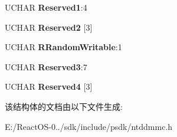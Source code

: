 \begin{DoxyCompactItemize}
U\+C\+H\+AR {\bfseries Reserved1}\+:4
\item 
\mbox{\label{struct___f_e_a_t_u_r_e___d_a_t_a___f_o_r_m_a_t_t_a_b_l_e_a8f4deebce1a43aa37687ca889d1733a8}} 
U\+C\+H\+AR {\bfseries Reserved2} \mbox{[}3\mbox{]}
\item 
\mbox{\label{struct___f_e_a_t_u_r_e___d_a_t_a___f_o_r_m_a_t_t_a_b_l_e_a5adfe7b12fdaf6207bcccc4b7d338055}} 
U\+C\+H\+AR {\bfseries R\+Random\+Writable}\+:1
\item 
\mbox{\label{struct___f_e_a_t_u_r_e___d_a_t_a___f_o_r_m_a_t_t_a_b_l_e_a37dd8a206783acf84486c616d6b99309}} 
U\+C\+H\+AR {\bfseries Reserved3}\+:7
\item 
\mbox{\label{struct___f_e_a_t_u_r_e___d_a_t_a___f_o_r_m_a_t_t_a_b_l_e_a91e3d33d0777e08d1067de4176a1d6f6}} 
U\+C\+H\+AR {\bfseries Reserved4} \mbox{[}3\mbox{]}
\end{DoxyCompactItemize}


该结构体的文档由以下文件生成\+:\begin{DoxyCompactItemize}
\item 
E\+:/\+React\+O\+S-\/0../sdk/include/psdk/ntddmmc.\+h\end{DoxyCompactItemize}
